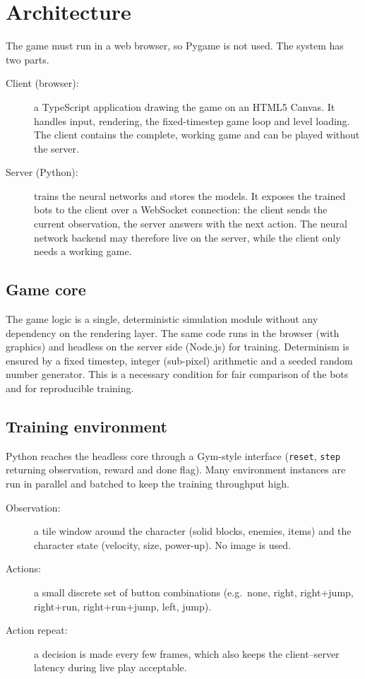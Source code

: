 \documentclass[11pt,a4paper]{article}
\begin{document}
\section{Architecture}

The game must run in a web browser, so Pygame is not used. The system has two parts.

\begin{description}
  \item[Client (browser):] a TypeScript application drawing the game on an HTML5 Canvas. It
        handles input, rendering, the fixed-timestep game loop and level loading. The client
        contains the complete, working game and can be played without the server.
  \item[Server (Python):] trains the neural networks and stores the models. It exposes the
        trained bots to the client over a WebSocket connection: the client sends the current
        observation, the server answers with the next action. The neural network backend may
        therefore live on the server, while the client only needs a working game.
\end{description}

\subsection{Game core}

The game logic is a single, deterministic simulation module without any dependency on the
rendering layer. The same code runs in the browser (with graphics) and headless on the server
side (Node.js) for training. Determinism is ensured by a fixed timestep, integer (sub-pixel)
arithmetic and a seeded random number generator. This is a necessary condition for fair
comparison of the bots and for reproducible training.

\subsection{Training environment}

Python reaches the headless core through a Gym-style interface (\texttt{reset}, \texttt{step}
returning observation, reward and done flag). Many environment instances are run in parallel
and batched to keep the training throughput high.

\begin{description}
  \item[Observation:] a tile window around the character (solid blocks, enemies, items) and
        the character state (velocity, size, power-up). No image is used.
  \item[Actions:] a small discrete set of button combinations (e.g.\ none, right,
        right+jump, right+run, right+run+jump, left, jump).
  \item[Action repeat:] a decision is made every few frames, which also keeps the
        client--server latency during live play acceptable.
\end{description}
\end{document}
